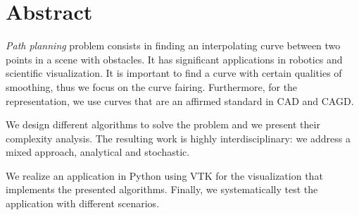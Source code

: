 \begingroup
\let\clearpage\relax
\let\cleardoublepage\relax
\let\cleardoublepage\relax

\chapter*{Abstract}
\emph{Path planning} problem consists in finding an interpolating curve
between two points in a scene with obstacles. It has significant
applications in robotics and scientific visualization. It is important to
find a curve with certain qualities of smoothing, thus we focus on the
curve fairing. Furthermore, for the representation, we use \bs curves
that are an affirmed standard in \ac{CAD} and \ac{CAGD}.

We design different algorithms to solve the problem and we present their
complexity analysis. The resulting work is highly interdisciplinary:
we address a mixed approach, analytical and stochastic.

We realize an application in
Python using \ac{VTK} for the visualization that implements the
presented algorithms. Finally, we systematically test the application
with different scenarios.
\endgroup			

\vfill


